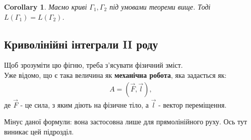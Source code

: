\documentclass[a4paper, 10pt]{article}
\makeatletter
\def\qed{$\blacksquare$}
\theoremstyle{theoremdd}
\theoremstyle{theoremdd}
\theoremstyle{theoremdd}
\theoremstyle{theoremdd}
\theoremstyle{theoremdd}
\theoremstyle{theoremdd}
\newtheorem{remark}[theorem]{Remark}
\theoremstyle{theoremdd}
\theoremstyle{theoremdd}
\newtheorem{corollary}[theorem]{Corollary}
\renewenvironment{proof}[1][Proof.\\]{\par
\pushQED{\hfill \qed}%
\normalfont \topsep6\p@\@plus6\p@\relax
\trivlist
\item\relax
{\bfseries
#1\@addpunct{.}}\hspace\labelsep\ignorespaces
}{%
\popQED\endtrivlist\@endpefalse
}
\newcommand\Norm[1]{\left\lVert#1\right\rVert}
\makeatother
\begin{document}

\begin{corollary}
Маємо криві $\Gamma_1, \Gamma_2$ під умовами теореми вище. Тоді $L(\Gamma_1) = L(\Gamma_2)$.
\end{corollary}

\subsection{Криволінійні інтеграли II роду}
Щоб зрозуміти цю фігню, треба з'ясувати фізичний зміст.\\
Уже відомо, що є така величина як \textbf{механічна робота}, яка задається як:
\begin{align*}
A = (\vec{F}, \vec{l}),
\end{align*}
де $\vec{F}$ - це сила, з яким діють на фізичне тіло, а $\vec{l}$ - вектор переміщення.
\begin{figure}[H]
\centering
{}
\end{figure}
Мінус даної формули: вона застосовна лише для прямолінійного руху. Ось тут виникає цей підрозділ.
\end{document}
